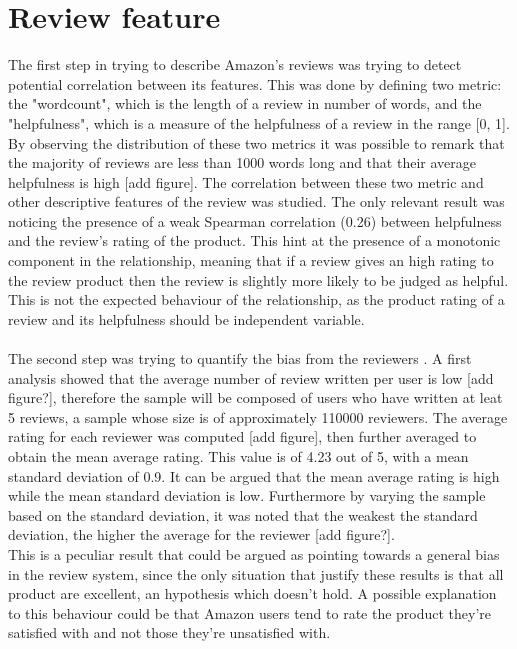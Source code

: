 \documentclass[11pt]{article}
\begin{document}
\section{Review feature}
    The first step in trying to describe Amazon's reviews was trying to detect potential correlation between its features. This was done by defining two metric: the "wordcount", which is 
  the length of a review in number of words, and the "helpfulness", which is a measure of the helpfulness of a review in the range [0, 1]. By observing the distribution of these two metrics it was possible to remark that the majority of reviews are less than 1000 words long and that their average helpfulness is high [add figure]. The correlation between these two metric and  other descriptive features of the review was studied. The only relevant result was noticing the presence of a weak Spearman correlation (0.26) between helpfulness and the review's rating of the product. This hint at the presence of a monotonic component in the relationship, meaning that if a review gives an high rating to the review product then the review is slightly more likely to be judged as helpful. This is not the expected behaviour of the relationship, as the product rating of a review and its helpfulness should be independent variable.\\\\
The second step was trying to quantify the bias from the reviewers . A first analysis showed that the average number of review written per user is low [add figure?], therefore the sample will be composed of users who have written at leat 5 reviews, a sample whose size is of approximately 110000 reviewers. The average rating for each reviewer was computed [add figure], then further averaged to obtain the mean average rating. This value is of 4.23 out of 5, with a mean standard deviation of 0.9. It can be argued that the mean average rating is high while the mean standard deviation is low. Furthermore by varying the sample based on the standard deviation, it was noted that the weakest the standard deviation, the higher the average for the reviewer [add figure?].\\ This is a peculiar result that could be argued as pointing towards a general bias in the review system, since the only situation that justify these results is that all product are excellent, an hypothesis which doesn't hold. A possible explanation to this behaviour could be that Amazon users  tend to rate the product they're satisfied with and not those they're unsatisfied with.\\\\
\end{document}
